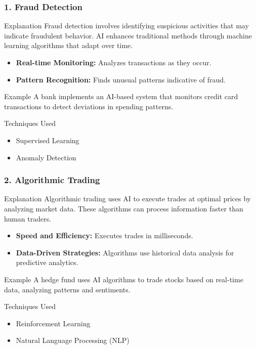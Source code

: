 \documentclass[aspectratio=169]{beamer}
\begin{document}
\begin{frame}[fragile]
    \frametitle{1. Fraud Detection}
    \begin{block}{Explanation}
        Fraud detection involves identifying suspicious activities that may indicate fraudulent behavior. AI enhances traditional methods through machine learning algorithms that adapt over time.
    \end{block}
    
    \begin{itemize}
        \item \textbf{Real-time Monitoring:} Analyzes transactions as they occur.
        \item \textbf{Pattern Recognition:} Finds unusual patterns indicative of fraud.
    \end{itemize}
    
    \begin{block}{Example}
        A bank implements an AI-based system that monitors credit card transactions to detect deviations in spending patterns.
    \end{block}
    
    \begin{block}{Techniques Used}
        \begin{itemize}
            \item Supervised Learning
            \item Anomaly Detection
        \end{itemize}
    \end{block}
\end{frame}

\begin{frame}[fragile]
    \frametitle{2. Algorithmic Trading}
    \begin{block}{Explanation}
        Algorithmic trading uses AI to execute trades at optimal prices by analyzing market data. These algorithms can process information faster than human traders.
    \end{block}

    \begin{itemize}
        \item \textbf{Speed and Efficiency:} Executes trades in milliseconds.
        \item \textbf{Data-Driven Strategies:} Algorithms use historical data analysis for predictive analytics.
    \end{itemize}
    
    \begin{block}{Example}
        A hedge fund uses AI algorithms to trade stocks based on real-time data, analyzing patterns and sentiments.
    \end{block}
    
    \begin{block}{Techniques Used}
        \begin{itemize}
            \item Reinforcement Learning
            \item Natural Language Processing (NLP)
        \end{itemize}
    \end{block}
\end{frame}
\end{document}
